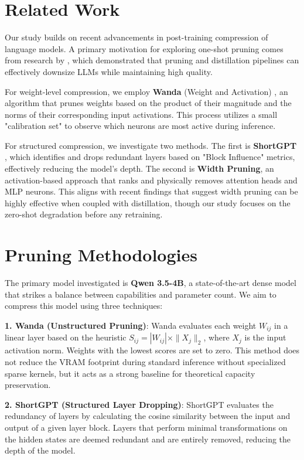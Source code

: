 \documentclass[11pt,a4paper,twocolumn]{article}
\begin{document}
\section{Related Work}
Our study builds on recent advancements in post-training compression of language models. A primary motivation for exploring one-shot pruning comes from research by \citet{muralidharan2024compact}, which demonstrated that pruning and distillation pipelines can effectively downsize LLMs while maintaining high quality. 

For weight-level compression, we employ \textbf{Wanda} (Weight and Activation) \cite{sun2023wanda}, an algorithm that prunes weights based on the product of their magnitude and the norms of their corresponding input activations. This process utilizes a small "calibration set" to observe which neurons are most active during inference. 

For structured compression, we investigate two methods. The first is \textbf{ShortGPT} \cite{men2024shortgpt}, which identifies and drops redundant layers based on "Block Influence" metrics,
effectively reducing the model's depth. The second is \textbf{Width Pruning}, an activation-based approach that ranks and physically removes attention heads and MLP neurons. This aligns with recent findings that suggest width pruning can be highly effective when coupled with distillation, though our study focuses on the zero-shot degradation before any retraining.

\section{Pruning Methodologies}
The primary model investigated is \textbf{Qwen 3.5-4B}, a state-of-the-art dense model that strikes a balance between capabilities and parameter count. We aim to compress this model using three techniques:

\textbf{1. Wanda (Unstructured Pruning)}: Wanda evaluates each weight $W_{ij}$ in a linear layer based on the heuristic $S_{ij} = |W_{ij}| \times \|X_j\|_2$, where $X_j$ is the input activation norm. Weights with the lowest scores are set to zero. This method does not reduce the VRAM footprint during standard inference without specialized sparse kernels, but it acts as a strong baseline for theoretical capacity preservation.

\textbf{2. ShortGPT (Structured Layer Dropping)}: ShortGPT evaluates the redundancy of layers by calculating the cosine similarity between the input and output of a given layer block.
Layers that perform minimal transformations on the hidden states are deemed redundant and are entirely removed, reducing the depth of the model.
\end{document}
